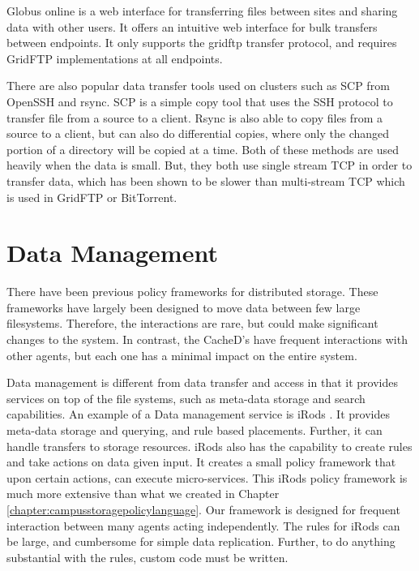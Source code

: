 Globus online \cite{foster2011globus} is a web interface for transferring files between sites and sharing data with other users.  It offers an intuitive web interface for bulk transfers between endpoints.  It only supports the gridftp \cite{allcock2005globus} transfer protocol, and requires GridFTP implementations at all endpoints.

There are also popular data transfer tools used on clusters such as SCP from OpenSSH \cite{openssh} and rsync.  SCP is a simple copy tool that uses the SSH protocol to transfer file from a source to a client.  Rsync is also able to copy files from a source to a client, but can also do differential copies, where only the changed portion of a directory will be copied at a time.  Both of these methods are used heavily when the data is small.  But, they both use single stream TCP in order to transfer data, which has been shown to be slower than multi-stream TCP which is used in GridFTP \cite{allcock2005globus} or BitTorrent.

\section{Data Management}

There have been previous policy frameworks for distributed storage.  These frameworks have largely been designed to move data between few large filesystems.  Therefore, the interactions are rare, but could make significant changes to the system.  In contrast, the CacheD's have frequent interactions with other agents, but each one has a minimal impact on the entire system.

Data management is different from data transfer and access in that it provides services on top of the file systems, such as meta-data storage and search capabilities.  An example of a Data management service is iRods \cite{rajasekar2010irods}.  It provides meta-data storage and querying, and rule based placements.  Further, it can handle transfers to storage resources.  iRods also has the capability to create rules and take actions on data given input.  It creates a small policy framework that upon certain actions, can execute micro-services.  This iRods policy framework is much more extensive than what we created in Chapter \ref{chapter:campusstoragepolicylanguage}.  Our framework is designed for frequent interaction between many agents acting independently.  The rules for iRods can be large, and cumbersome for simple data replication.  Further, to do anything substantial with the rules, custom code must be written.

